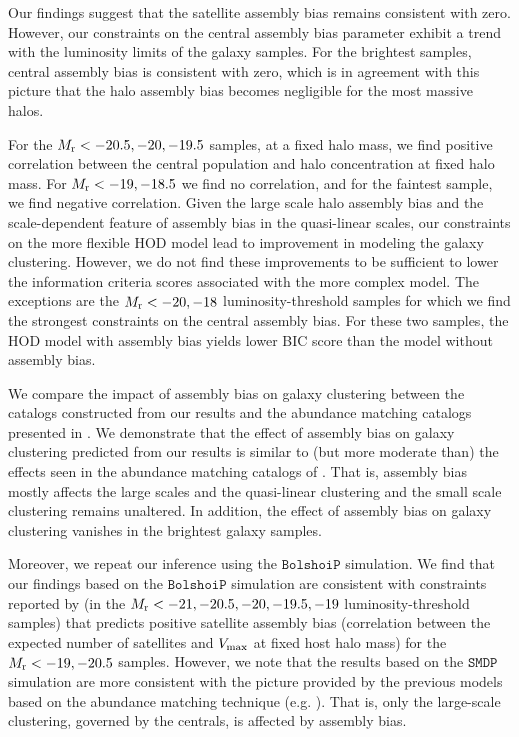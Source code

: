 \documentclass[twocolumn]{aastex61}
\begin{document}
Our findings suggest that the satellite assembly bias remains consistent with zero. However, our constraints on the central assembly bias parameter exhibit a trend with the luminosity limits of the galaxy samples. For the brightest samples, central assembly bias is consistent with zero, which is in agreement with this picture that the halo assembly bias becomes negligible for the most massive halos. 

For the $M_{\rm r}<-20.5, -20, -19.5$ samples, at a fixed halo mass, we find positive correlation between the central population and halo concentration at fixed halo mass. For $M_{\rm r}<-19, -18.5$ we find no correlation, and for the faintest sample, we find negative correlation. Given the large scale halo assembly bias and the scale-dependent feature of assembly bias in the quasi-linear scales, our constraints on the more flexible HOD model lead to improvement in modeling the galaxy clustering. However, we do not find these improvements to be sufficient to lower the information criteria scores associated with the more complex model. The exceptions are the $M_{\rm r}<-20,-18$ luminosity-threshold samples for which we find the strongest constraints on the central assembly bias. For these two samples, the HOD model with assembly bias yields lower BIC score than the model without assembly bias.

We compare the impact of assembly bias on galaxy clustering between the catalogs constructed from our results and the abundance matching catalogs presented in \citet{hw2013,arz2014}. We demonstrate that the effect of assembly bias on galaxy clustering predicted from our results is similar to (but more moderate than) the effects seen in the abundance matching catalogs of \citet{hw2013}. That is, assembly bias mostly affects the large scales and the quasi-linear clustering and the small scale clustering remains unaltered. In addition, the effect of assembly bias on galaxy clustering vanishes in the brightest galaxy samples.

Moreover, we repeat our inference using the $\mathtt{BolshoiP}$ simulation. 
We find that our findings based on the $\mathtt{BolshoiP}$ simulation are consistent with constraints reported by \citet{zentner2016} (in the $M_{\rm r}<-21, -20.5, -20, -19.5, -19$ luminosity-threshold samples) that predicts positive satellite assembly bias (correlation between the expected number of satellites and $V_{\rm max}$ at fixed host halo mass) for the $M_{\rm r}<-19, -20.5$ samples. However, we note that the results based on the $\mathtt{SMDP}$ simulation are more consistent with the picture provided by the previous models based on the abundance matching technique (e.g. \citealt{arz2014,lehman2015}). That is, only the large-scale clustering, governed by the centrals, is affected by assembly bias.
\end{document}
